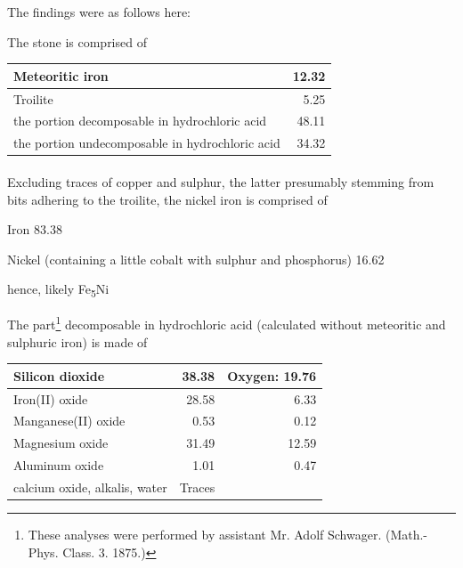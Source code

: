 \documentclass[a4paper, 12pt, oneside]{article}
\begin{document}
The findings were as follows here:

The stone is comprised of
\begin{center}
    \begin{tabular}{ |l|r| } 
    \hline
    Meteoritic iron & 12.32\\\hline
    Troilite & 5.25\\\hline
    the portion decomposable in hydrochloric acid & 48.11\\\hline
    the portion undecomposable in hydrochloric acid & 34.32\\
    \hline
    \end{tabular}
\end{center}
\paragraph*{}
Excluding traces of copper and sulphur, the latter presumably stemming from bits adhering to the troilite, the nickel iron is comprised of

Iron 83.38

Nickel (containing a little cobalt with sulphur and phosphorus) 16.62

hence, likely Fe\textsubscript{5}Ni

The part\footnote{These analyses were performed by assistant Mr. Adolf Schwager. (Math.-Phys. Class. 3. 1875.)} decomposable in hydrochloric acid (calculated without meteoritic and sulphuric iron) is made of
\begin{center}
    \begin{tabular}{ |l|r|r| } 
    \hline
    Silicon dioxide & 38.38 & Oxygen: 19.76\\\hline
    Iron(II) oxide & 28.58 & 6.33\\\hline
    Manganese(II) oxide & 0.53 & 0.12\\\hline
    Magnesium oxide & 31.49 & 12.59\\\hline
    Aluminum oxide & 1.01 & 0.47\\\hline
    calcium oxide, alkalis, water & Traces &\\
    \hline
    \end{tabular}
\end{center}
\end{document}
